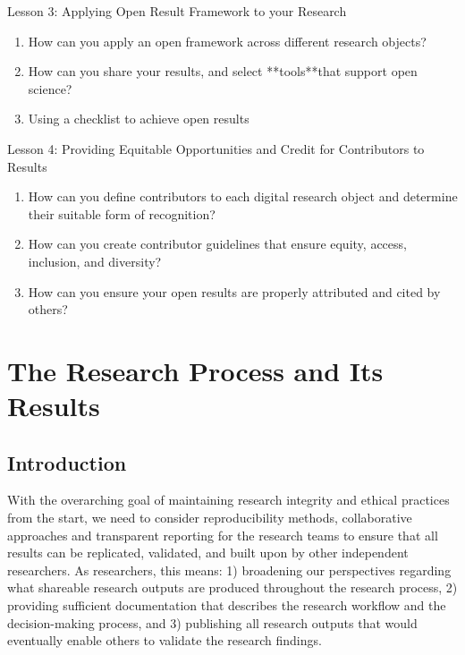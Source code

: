 \documentclass[
  letterpaper,
  DIV=11,
  numbers=noendperiod]{scrreport}
\providecommand{\tightlist}{%
  \setlength{\itemsep}{0pt}\setlength{\parskip}{0pt}}\usepackage{longtable,booktabs,array}
\begin{document}
Lesson 3: Applying Open Result Framework to your Research

\begin{enumerate}
\def\labelenumi{\arabic{enumi}.}
\tightlist
\item
  How can you apply an open framework across different research objects?
\item
  How can you share your results, and select **tools**that support open
  science?
\item
  Using a checklist to achieve open results
\end{enumerate}

Lesson 4: Providing Equitable Opportunities and Credit for Contributors
to Results

\begin{enumerate}
\def\labelenumi{\arabic{enumi}.}
\tightlist
\item
  How can you define contributors to each digital research object and
  determine their suitable form of recognition?
\item
  How can you create contributor guidelines that ensure equity, access,
  inclusion, and diversity?
\item
  How can you ensure your open results are properly attributed and cited
  by others?
\end{enumerate}

\hypertarget{the-research-process-and-its-results}{%
\chapter{The Research Process and Its
Results}\label{the-research-process-and-its-results}}

\hypertarget{introduction-15}{%
\section{Introduction}\label{introduction-15}}

With the overarching goal of maintaining research integrity and ethical
practices from the start, we need to consider reproducibility methods,
collaborative approaches and transparent reporting for the research
teams to ensure that all results can be replicated, validated, and built
upon by other independent researchers. As researchers, this means: 1)
broadening our perspectives regarding what shareable research outputs
are produced throughout the research process, 2) providing sufficient
documentation that describes the research workflow and the
decision-making process, and 3) publishing all research outputs that
would eventually enable others to validate the research findings.
\end{document}
